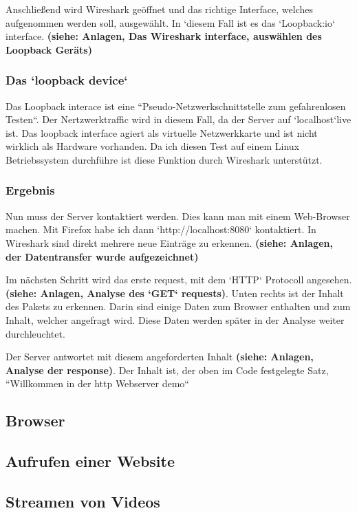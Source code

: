\documentclass[12pt]{article}
\begin{document}
Anschließend wird Wireshark geöffnet und das richtige Interface, welches aufgenommen werden soll, ausgewählt. In `diesem Fall ist es das `Loopback:io` interface. \textbf{(siehe: Anlagen, Das Wireshark interface, auswählen des Loopback Geräts)}
\subsubsection{Das `loopback device`}

Das Loopback interace ist eine ``Pseudo-Netzwerkschnittstelle zum gefahrenlosen Testen``\cite{loopback-munich}. Der Nertzwerktraffic wird in diesem Fall, da der Server auf `localhost`live ist. Das loopback interface agiert als virtuelle Netzwerkkarte und ist nicht wirklich als Hardware vorhanden. Da ich diesen Test auf einem Linux Betriebssystem durchführe ist diese Funktion durch Wireshark unterstützt.\cite{loopback-wireshark}

\subsubsection{Ergebnis}

Nun muss der Server kontaktiert werden. Dies kann man mit einem Web-Browser machen. Mit Firefox habe ich dann `http://localhost:8080` kontaktiert. In Wireshark sind direkt mehrere neue Einträge zu erkennen. \textbf{(siehe: Anlagen, der Datentransfer wurde aufgezeichnet)}

Im nächsten Schritt wird das erste request, mit dem `HTTP` Protocoll angesehen. \textbf{(siehe: Anlagen, Analyse des `GET` requests)}. Unten rechts ist der Inhalt des Pakets zu erkennen. Darin sind einige Daten zum Browser enthalten und zum Inhalt, welcher angefragt wird. Diese Daten werden später in der Analyse weiter durchleuchtet.

Der Server antwortet mit diesem angeforderten Inhalt \textbf{(siehe: Anlagen, Analyse der response)}. Der Inhalt ist, der oben im Code festgelegte Satz, ``Willkommen in der http Webserver demo``

\subsection{Browser}
\subsection{Aufrufen einer Website}
\subsection{Streamen von Videos}
\end{document}
